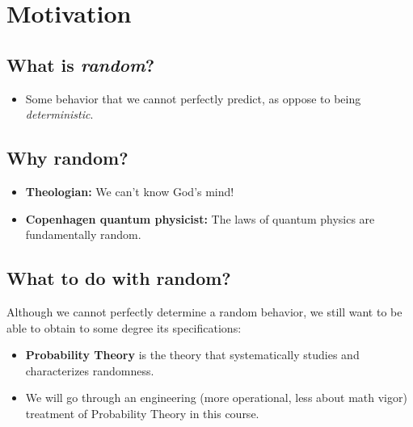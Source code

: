 
\section{Motivation}
\subsection{What is \emph{random}?}
\begin{itemize}
  \item Some behavior that we cannot perfectly predict, as oppose to
    being \emph{deterministic}.
\end{itemize}

\subsection{Why random?}
\begin{itemize}
\item \textbf{Theologian:}  We can't know God's mind! 
\item \textbf{Copenhagen quantum physicist:} The laws of quantum physics are fundamentally random.
\end{itemize}
  
\subsection{What to do with random?}
Although we cannot perfectly determine a random behavior, we still want to be
able to obtain to some degree its specifications:
\begin{itemize}
  \item \textbf{Probability Theory} is the theory that systematically studies and characterizes randomness.
  \item We will go through an engineering (more operational, less
    about math vigor) treatment of Probability Theory in this course.
\end{itemize}


